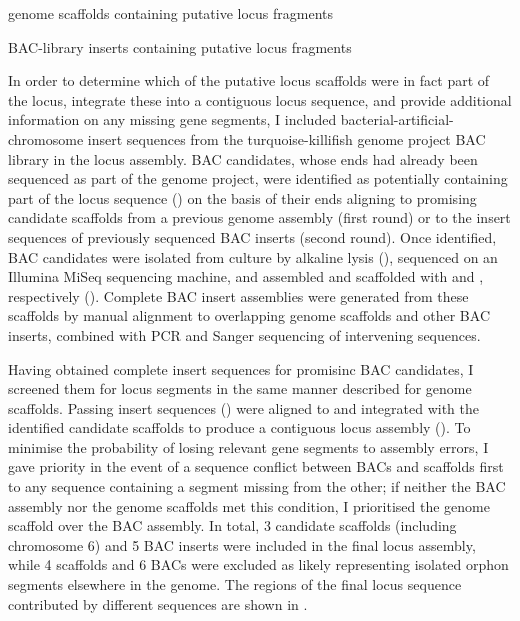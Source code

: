 \begin{table}[bh]
\centering
\caption{\Nfu genome scaffolds containing putative \igh{} locus fragments}
\begin{threeparttable}

\end{threeparttable}
\label{tab:nfu-locus-scaffolds}
\end{table}

\begin{table}[bh]
\centering
\caption{\Nfu BAC-library inserts containing putative \igh{} locus fragments}
\begin{threeparttable}

\end{threeparttable}
\label{tab:nfu-locus-bacs}
\end{table}

In order to determine which of the putative locus scaffolds were in fact part of the \igh{} locus, integrate these into a contiguous locus sequence, and provide additional information on any missing gene segments, I included bacterial-artificial-chromosome insert sequences from the turquoise-killifish genome project BAC library \parencite{reichwald2015genome} in the locus assembly. BAC candidates, whose ends had already been sequenced as part of the genome project, were identified as potentially containing part of the locus sequence () on the basis of their ends aligning to promising candidate scaffolds from a previous genome assembly (first round) or to the insert sequences of previously sequenced BAC inserts (second round). Once identified,  BAC candidates were isolated from culture by alkaline lysis (), sequenced on an Illumina MiSeq sequencing machine, and assembled and scaffolded with  and , respectively (). Complete BAC insert assemblies were generated from these scaffolds by manual alignment to overlapping genome scaffolds and other BAC inserts, combined with PCR and Sanger sequencing of intervening sequences.

Having obtained complete insert sequences for promisinc BAC candidates, I screened them for \igh{} locus segments in the same manner described for genome scaffolds. Passing insert sequences () were aligned to and integrated with the identified candidate scaffolds to produce a contiguous locus assembly (). To minimise the probability of losing relevant gene segments to assembly errors, I gave priority in the event of a sequence conflict between BACs and scaffolds first to any sequence containing a segment missing from the other; if neither the BAC assembly nor the genome scaffolds met this condition, I prioritised the genome scaffold over the BAC assembly. In total, 3 candidate scaffolds (including chromosome 6) and 5 BAC inserts were included in the final locus assembly, while 4 scaffolds and 6 BACs were excluded as likely representing isolated \igh{} orphon segments elsewhere in the genome. The regions of the final locus sequence contributed by different sequences are shown in .

